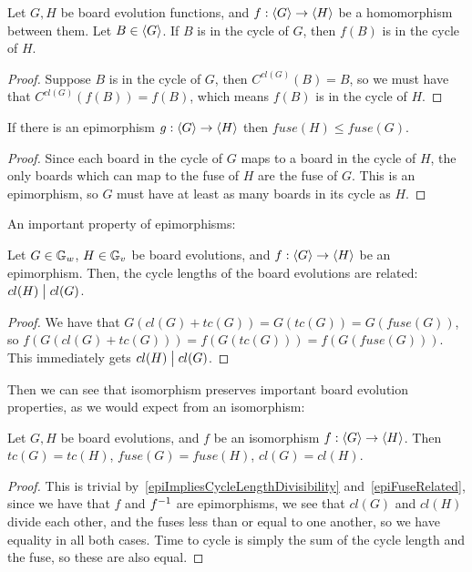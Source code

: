 \documentclass[12pt,letterpaper]{article}
\begin{document}
\begin{prop}\label{cyclesMapToCycles}
  Let $G,H$ be board evolution functions, and $f:\langle G\rangle\rightarrow\langle H\rangle$ be a homomorphism between them. Let $B\in\langle G\rangle$. If $B$ is in the cycle of $G$, then $f(B)$ is in the cycle of $H$.
\end{prop}
\begin{proof}
  Suppose $B$ is in the cycle of $G$, then $C^{cl(G)}(B)=B$, so we must have that $C^{cl(G)}(f(B))=f(B)$, which means $f(B)$ is in the cycle of $H$.
\end{proof}
\begin{cor}\label{epiFuseRelated}
  If there is an epimorphism $g:\langle G\rangle\rightarrow\langle H\rangle$ then $fuse(H)\leq fuse(G)$.
\end{cor}
\begin{proof}
  Since each board in the cycle of $G$ maps to a board in the cycle of $H$, the only boards which can map to the fuse of $H$ are the fuse of $G$. This is an epimorphism, so $G$ must have at least as many boards in its cycle as $H$.
\end{proof}

An important property of epimorphisms:

\begin{prop}\label{epiImpliesCycleLengthDivisibility}
  Let $G\in \mathbb{G}_w$, $H\in \mathbb{G}_v$ be board evolutions, and $f:\langle G\rangle\rightarrow \langle H\rangle$ be an epimorphism. Then, the cycle lengths of the board evolutions are related: $cl(H)\bigm| cl(G)$.
\end{prop}
\begin{proof}
  We have that $G(cl(G)+tc(G))=G(tc(G))=G(fuse(G))$, so $f(G(cl(G)+tc(G)))=f(G(tc(G)))=f(G(fuse(G)))$. This immediately gets $cl(H)\bigm| cl(G)$. %
\end{proof}

Then we can see that isomorphism preserves important board evolution properties, as we would expect from an isomorphism:
\begin{prop}\label{isomPreservesCycles}
  Let $G, H$ be board evolutions, and $f$ be an isomorphism $f:\langle G\rangle\rightarrow\langle H\rangle$. Then $tc(G)=tc(H)$, $fuse(G)=fuse(H)$, $cl(G)=cl(H)$.
\end{prop}
\begin{proof}
  This is trivial by~\cref{epiImpliesCycleLengthDivisibility} and~\cref{epiFuseRelated}, since we have that $f$ and ${f}^{-1}$ are epimorphisms, we see that $cl(G)$ and $cl(H)$ divide each other, and the fuses less than or equal to one another, so we have equality in all both cases. Time to cycle is simply the sum of the cycle length and the fuse, so these are also equal.
\end{proof}
\end{document}
